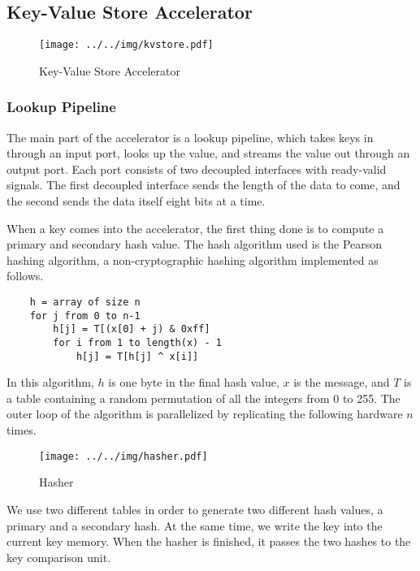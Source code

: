 \subsection{Key-Value Store Accelerator}

\begin{figure}[h]
    \begin{center}
\texttt{[image: ../../img/kvstore.pdf]}
\caption{Key-Value Store Accelerator}
\label{fig:kvstore}
    \end{center}
\end{figure}

\subsubsection{Lookup Pipeline}

The main part of the accelerator is a lookup pipeline, which takes keys in
through an input port, looks up the value, and streams the value out through an
output port. Each port consists of two decoupled interfaces with ready-valid
signals. The first decoupled interface sends the length of the data to come,
and the second sends the data itself eight bits at a time.

When a key comes into the accelerator, the first thing done is to compute a
primary and secondary hash value. The hash algorithm used is the Pearson
hashing algorithm, a non-cryptographic hashing algorithm implemented as follows.

{\footnotesize
\begin{verbatim}
    h = array of size n
    for j from 0 to n-1
        h[j] = T[(x[0] + j) & 0xff]
        for i from 1 to length(x) - 1
            h[j] = T[h[j] ^ x[i]]
\end{verbatim}
}

In this algorithm, \(h\) is one byte in the final hash value,
\(x\) is the message, and \(T\) is a table containing a random permutation of
all the integers from 0 to 255. The outer loop of the algorithm is
parallelized by replicating the following hardware \(n\) times.

\begin{figure}[h]
    \begin{center}
\texttt{[image: ../../img/hasher.pdf]}
\caption{Hasher}
\label{fig:hasher}
    \end{center}
\end{figure}
We use two different tables in order to generate two different hash values,
a primary and a secondary hash. At the same time, we write the key into the
current key memory. When the hasher is finished, it passes the two hashes
to the key comparison unit.

